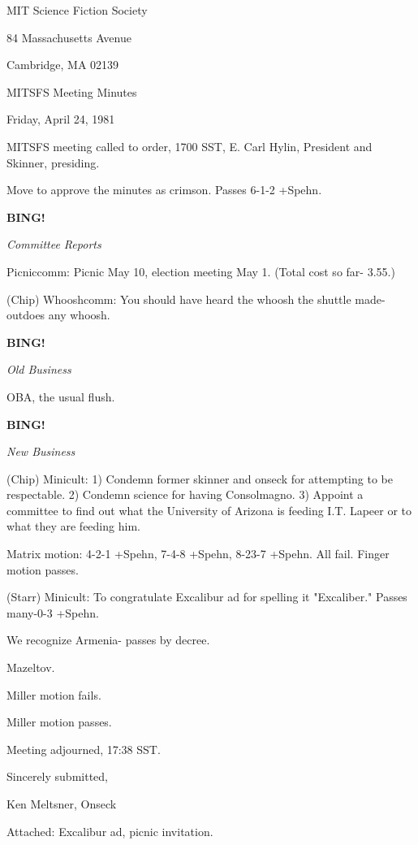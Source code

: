 \documentclass[12pt]{article}
\newcommand{\bing}{{\bf BING!} }
\newcommand{\goto}[1]{\bing \vskip 12pt \centerline{{\em{#1}}}}
\begin{document}
\begin{center}

MIT Science Fiction Society 

84 Massachusetts Avenue

Cambridge, MA 02139

\vspace{12pt}

MITSFS Meeting Minutes 

Friday, April 24, 1981

\end{center}
 
\vspace{18pt}

\setlength{\parskip}{6pt}

\noindent
MITSFS meeting called to order, 1700 SST,
E. Carl Hylin, President and Skinner, presiding.

Move to approve the minutes as crimson. Passes 6-1-2 +Spehn.

\goto{Committee Reports}

Picniccomm: Picnic May 10, election meeting May 1. (Total cost so far- 3.55.)

(Chip) Whooshcomm: You should have heard the whoosh the shuttle made- outdoes any whoosh.

\goto{Old Business}

OBA, the usual flush.

\goto{New Business}

(Chip) Minicult: 1) Condemn former skinner and onseck for attempting to be respectable. 2) Condemn science for having Consolmagno. 3) Appoint a committee to find out what the University of Arizona is feeding I.T. Lapeer or to what they are feeding him.

Matrix motion: 4-2-1 +Spehn, 7-4-8 +Spehn, 8-23-7 +Spehn. All fail. Finger motion passes.

(Starr) Minicult: To congratulate Excalibur ad for spelling it "Excaliber." Passes many-0-3 +Spehn.

We recognize Armenia- passes by decree.

Mazeltov.

Miller motion fails.

Miller motion passes.

\vspace{12pt}

\noindent
Meeting adjourned, 17:38 SST.

\vspace{18pt}

\centerline{Sincerely submitted,}
\centerline{Ken Meltsner, Onseck}

Attached: Excalibur ad, picnic invitation.
\end{document}
